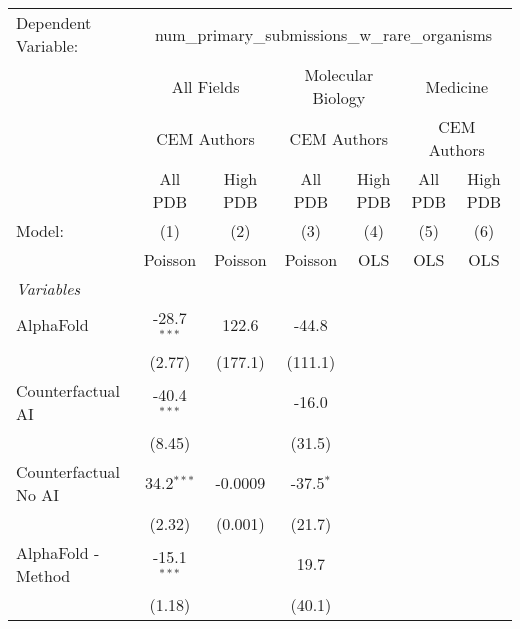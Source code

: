 \begingroup
\centering
\begin{tabular}{lcccccc}
   \tabularnewline \midrule \midrule
   Dependent Variable: & \multicolumn{6}{c}{num\_primary\_submissions\_w\_rare\_organisms}\\
 & \multicolumn{2}{c}{All Fields} & \multicolumn{2}{c}{Molecular Biology} & \multicolumn{2}{c}{Medicine} \\
\cmidrule(lr){2-3} \cmidrule(lr){4-5} \cmidrule(lr){6-7}
 & \multicolumn{2}{c}{CEM Authors} & \multicolumn{2}{c}{CEM Authors} & \multicolumn{2}{c}{CEM Authors} \\
\cmidrule(lr){2-3} \cmidrule(lr){4-5} \cmidrule(lr){6-7}
 & \multicolumn{1}{c}{All PDB} & \multicolumn{1}{c}{High PDB} & \multicolumn{1}{c}{All PDB} & \multicolumn{1}{c}{High PDB} & \multicolumn{1}{c}{All PDB} & \multicolumn{1}{c}{High PDB} \\
\cmidrule(lr){2-2} \cmidrule(lr){3-3} \cmidrule(lr){4-4} \cmidrule(lr){5-5} \cmidrule(lr){6-6} \cmidrule(lr){7-7}
   Model:                                                     & (1)            & (2)     & (3)         & (4)  & (5)  & (6)\\  
                                                              &  Poisson       & Poisson & Poisson     & OLS  & OLS  & OLS\\  
   \midrule
   \emph{Variables}\\
   AlphaFold                                                  & -28.7$^{***}$  & 122.6   & -44.8       &      &      &   \\   
                                                              & (2.77)         & (177.1) & (111.1)     &      &      &   \\   
   Counterfactual AI                                          & -40.4$^{***}$  &         & -16.0       &      &      &   \\   
                                                              & (8.45)         &         & (31.5)      &      &      &   \\   
   Counterfactual No AI                                       & 34.2$^{***}$   & -0.0009 & -37.5$^{*}$ &      &      &   \\   
                                                              & (2.32)         & (0.001) & (21.7)      &      &      &   \\   
   AlphaFold - Method                                         & -15.1$^{***}$  &         & 19.7        &      &      &   \\   
                                                              & (1.18)         &         & (40.1)      &      &      &   \\   

\end{tabular}
